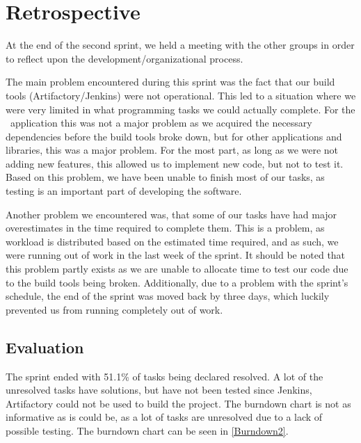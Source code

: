 \section{Retrospective}\label{S2Retro}
At the end of the second sprint, we held a meeting with the other groups in
order to reflect upon the development/organizational process.\nl

The main problem encountered during this sprint was the fact that our build
tools (Artifactory/Jenkins) were not operational. This led to a
situation where we were very limited in what programming tasks we could actually
complete. For the \lapp\ application this was not a major problem as we
acquired the necessary dependencies before the build tools broke down, but for
other applications and libraries, this was a major problem. For the most part,
as long as we were not adding new features, this allowed us to implement new
code, but not to test it. Based on this problem, we have been unable to finish
most of our tasks, as testing is an important part of developing the
software.\nl

Another problem we encountered was, that some of our tasks have had major
overestimates in the time required to complete them. This is a problem, as
workload is distributed based on the estimated time required, and as such, we
were running out of work in the last week of the sprint. It should be noted that
this problem partly exists as we are unable to allocate time to test our code
due to the build tools being broken. Additionally, due to a problem with the
sprint's schedule, the end of the sprint was moved back by three days, which
luckily prevented us from running completely out of work.

\subsection{Evaluation}
The sprint ended with 51.1\% of tasks being declared resolved. A lot of the
unresolved tasks have solutions, but have not been tested since Jenkins,
Artifactory could not be used to build the project.
The burndown chart is not as informative as is could be, as a lot of tasks are
unresolved due to a lack of possible testing. The burndown chart can be seen in
\autoref{Burndown2}.







